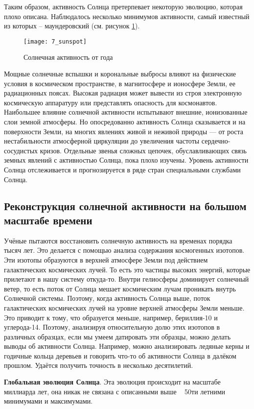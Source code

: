 Таким образом, активность Солнца претерпевает некоторую эволюцию, которая плохо описана. Наблюдалось несколько минимумов активности, самый известный из которых – маундеровский (см. рисунок \ref{fig:7_sunspot}).

\begin{figure}[H]
	\centering
	\texttt{[image: 7\_sunspot]}
	\caption{Солнечная активность от года}
	\label{fig:7_sunspot}
\end{figure} 

Мощные солнечные вспышки и корональные выбросы влияют на физические условия в космическом пространстве, в магнитосфере и ионосфере Земли, ее радиационных поясах. Высокая радиация может вывести из строя электронную космическую аппаратуру или представлять опасность для космонавтов. Наибольшее влияние солнечной активности испытывают внешние, ионизованные слои земной атмосферы. Но опосредованно активность Солнца сказывается и на поверхности Земли, на многих явлениях живой и неживой природы — от роста нестабильности атмосферной циркуляции до увеличения частоты сердечно-сосудистых кризов. Отдельные звенья сложных цепочек, обуславливающих связь земных явлений с активностью Солнца, пока плохо изучены. Уровень активности Солнца отслеживается и прогнозируется в ряде стран специальными службами Солнца.

\subsection{Реконструкция солнечной активности на большом масштабе времени}

Учёные пытаются восстановить солнечную активность на временах порядка тысяч лет. Это делается с помощью анализа содержания космогенных изотопов. Эти изотопы образуются в верхней атмосфере Земли под действием галактических космических лучей. То есть это частицы высоких энергий, которые прилетают в нашу систему откуда-то. Внутри гелиосферы доминирует солнечный ветер, то есть поток от Солнца мешает космическим лучам проникать внутрь Солнечной системы. Поэтому, когда активность Солнца выше, поток галактических космических лучей на уровне верхней атмосферы Земли меньше. Это приводит к тому, что образуется меньше, например, бериллия-10 и углерода-14. Поэтому, анализируя относительную долю этих изотопов в различных образцах, если мы умеем датировать эти образцы, можно делать выводы об активности Солнца. Например, можно анализировать ледяные керны и годичные кольца деревьев и говорить что-то об активности Солнца в далёком прошлом. Удаётся получить точность в несколько десятилетий.

\textbf{Глобальная эволюция Солнца}. Эта эволюция происходит на масштабе миллиарда лет, она никак не связана с описанными выше ~ 50ти летними минимумами и максимумами.
